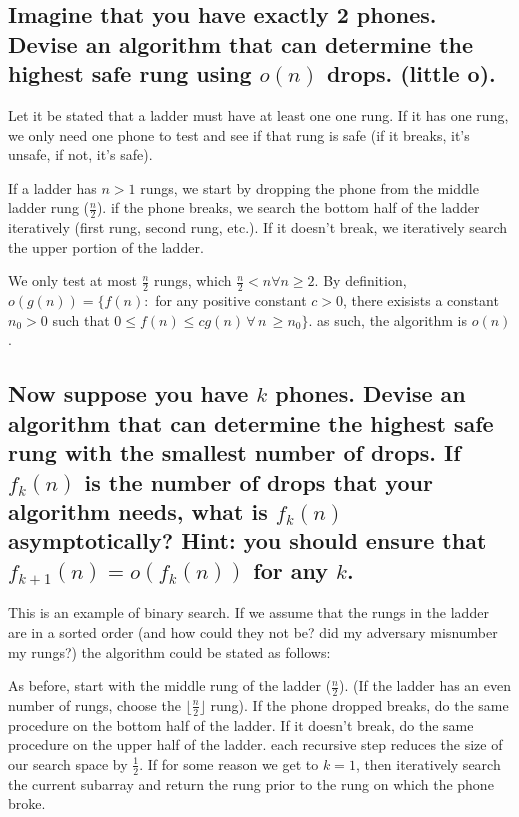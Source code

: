 \documentclass[titlepage]{article}\usepackage[]{graphicx}\usepackage[]{color}
\begin{document}
\subsection{ Imagine that you have exactly 2 phones. Devise an algorithm that
  can determine
the highest safe rung using $o(n)$ drops. (little o). }

  Let it be stated that a ladder must have at least one one rung. If it has
  one rung, we only need one phone to test and see if that rung is safe (if it
  breaks, it's unsafe, if not, it's safe).

  If a ladder has $n > 1$ rungs, we start by dropping the phone from the middle
  ladder rung ($\frac{n}{2}$). if the phone breaks, we search the bottom half of the
  ladder iteratively (first rung, second rung, etc.). If it doesn't break, we
  iteratively search the upper portion of the ladder. 

  We only test at most $\frac{n}{2}$ rungs, which $\frac{n}{2} < n
  \forall n \geq 2$. 
  By definition, $o(g(n)) = \{ f(n) : $ for any positive constant $c>0$, there
  exisists a constant $n_0 > 0$ such that $0 \leq f(n) \leq cg(n) \, \forall \,
  n \, \geq n_0\}$.
  as such, the algorithm is $o(n)$. 

\subsection{Now suppose you have $k$ phones. Devise an algorithm that can
  determine the highest safe rung with the smallest number of drops. If
  $f_k(n)$
  is the number of drops that your algorithm needs, what is 
  $f_k(n)$ asymptotically? Hint: you should ensure that 
  $f_{k+1}(n) = o(f_k(n))$ for any $k$.}

  This is an example of binary search. If we assume that the rungs in the
  ladder are in a sorted order (and how could they not be? did my adversary
  misnumber my rungs?)  the algorithm could
  be stated as follows:

  As before, start with the middle rung of the ladder ($\frac{n}{2}$). (If the
  ladder has an even number of rungs, choose the $\lfloor
  \frac{n}{2} \rfloor$ rung). If the
  phone dropped breaks, do the same procedure on the bottom half of the ladder.
  If it doesn't break, do the same procedure on the upper half of the ladder.
  each recursive step reduces the size of our search space by $\frac{1}{2}$. If
  for some reason we get to $k=1$, then iteratively search the current subarray
  and return the rung prior to the rung on which the phone broke.
\end{document}
